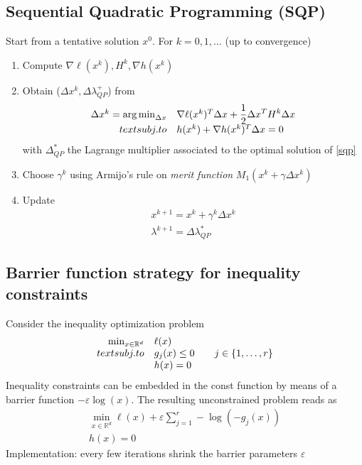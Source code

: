 \documentclass{book}
\DeclareMathOperator*{\argmin}{arg\,min}
\newcommand{\R}{\mathbb{R}}
\theoremstyle{definition}
\theoremstyle{remark}
\theoremstyle{remark}
\begin{document}
\subsection{Sequential Quadratic Programming (SQP)}
Start from a tentative solution $x^0$. For $k=0,1,\dots$ (up to convergence)
\begin{enumerate}
    \item Compute $\nabla\ell(x^k),H^k,\nabla h(x^k)$ 
    \item Obtain ($\Delta x^k, \Delta \lambda^+_{QP}$) from 
        \begin{equation}\label{sqp}
            \begin{array}{r l}
                \Delta x^k = \argmin_{\Delta x} & \nabla \ell(x^k)^T\Delta x +\displaystyle\frac{1}{2}\Delta x^TH^k \Delta x \\
                text{subj. to} & h(x^k) + \nabla h(x^k)^T \Delta x = 0
            \end{array}
        \end{equation}
        with $\Delta^*_{QP}$ the Lagrange multiplier associated to the optimal solution of \eqref{sqp}
    \item Choose $\gamma^k$ using Armijo's rule on \emph{merit function} $M_1(x^k+\gamma\Delta x^k)$
    \item Update 
        \begin{gather*}
            x^{k+1} = x^k+ \gamma^k\Delta x^k \\
            \lambda^{k+1} = \Delta \lambda^*_{QP}
        \end{gather*}
\end{enumerate}

\subsection{Barrier function strategy for inequality constraints}
Consider the inequality optimization problem 
\[
    \begin{array}{r l}
        \min_{x\in\R^d} & \ell(x) \\
        text{subj. to} & g_j(x) \leq 0 \qquad j\in\{1,\dots,r\}\\
                       & h(x) = 0
    \end{array}
\]
Inequality constraints can be embedded in the const function by means of a barrier function $-\varepsilon \log(x)$. The resulting unconstrained problem reads as 
\begin{gather*}
    \min_{x\in\R^d}\ell(x) + \varepsilon\displaystyle\sum_{j=1}^{r}-\log(-g_j(x)) \\
    h(x) = 0
\end{gather*}
Implementation: every few iterations shrink the barrier parameters $\varepsilon$
\end{document}
